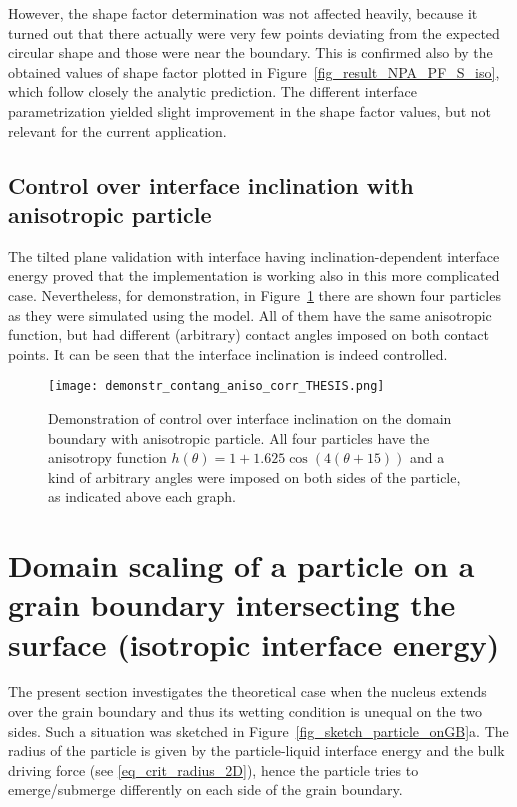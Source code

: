 	However, the shape factor determination was not affected heavily, because it turned out that there actually were very few points deviating from the expected circular shape and those were near the boundary. This is confirmed also by the obtained values of shape factor plotted in Figure~\ref{fig_result_NPA_PF_S_iso}, which follow closely the analytic prediction. The different interface parametrization yielded slight improvement in the shape factor values, but not relevant for the current application.
	
	\subsection{Control over interface inclination with anisotropic particle}
	The tilted plane validation with interface having inclination-dependent interface energy proved that the implementation is working also in this more complicated case. Nevertheless, for demonstration, in Figure~\ref{fig_demo_aniso_paticle_contangs_controlled} there are shown four particles as they were simulated using the model. All of them have the same anisotropic function, but had different (arbitrary) contact angles imposed on both contact points. It can be seen that the interface inclination is indeed controlled.
	
	\begin{figure}
		\centering
		\texttt{[image: demonstr\_contang\_aniso\_corr\_THESIS.png]}
		\caption[Demonstration of control over interface inclination on the domain boundary with anisotropic particle.]{Demonstration of control over interface inclination on the domain boundary with anisotropic particle. All four particles have the anisotropy function $h(\theta)=1+1.625\cos(4(\theta+15))$ and a kind of arbitrary angles were imposed on both sides of the particle, as indicated above each graph.}
		\label{fig_demo_aniso_paticle_contangs_controlled}
	\end{figure}
		

\section{Domain scaling of a particle on a grain boundary intersecting the surface (isotropic interface energy)}
The present section investigates the theoretical case when the nucleus extends over the grain boundary and thus its wetting condition is unequal on the two sides. Such a situation was sketched in Figure~\ref{fig_sketch_particle_onGB}a. The radius of the particle is given by the particle-liquid interface energy and the bulk driving force (see \eqref{eq_crit_radius_2D}), hence the particle tries to emerge/submerge differently on each side of the grain boundary.

